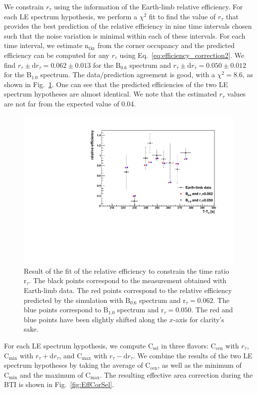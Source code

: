 \documentclass[preprint]{aastex631}
\begin{document}
We constrain $r_\tau$ using the information of the Earth-limb relative efficiency. For each LE spectrum hypothesis, we perform a $\chi^2$ fit to find the value of $r_\tau$ that provides the best prediction of the relative efficiency in nine time intervals chosen such that the noise variation is minimal within each of these intervals. For each time interval, we estimate $\mathrm{n}_\mathrm{tkr}$ from the corner occupancy and the predicted efficiency can be computed for any $r_\tau$ using Eq.~\ref{eq:efficiency_correction2}. We find $r_\tau \pm \mathrm{d}r_\tau = 0.062 \pm 0.013$ for the $\mathrm{B}_{0.6}$ spectrum and $r_\tau \pm \mathrm{d}r_\tau = 0.050 \pm 0.012$ for the $\mathrm{B}_{1.0}$ spectrum. The data/prediction agreement is good, with a $\chi^2 = 8.6$, as shown in Fig.~\ref{fig:Fit_rtau}. One can see that the predicted efficiencies of the two LE spectrum hypotheses are almost identical. We note that the estimated $r_\tau$ values are not far from the expected value of 0.04.

\begin{figure}[t]
    \centering
    \includegraphics[width=0.6\linewidth]{paper_showfitrtau.pdf}
    \caption{Result of the fit of the relative efficiency to constrain the time ratio $\mathrm{r}_\tau$. The black points correspond to the measurement obtained with Earth-limb data. The red points correspond to the relative efficiency predicted by the simulation with $\mathrm{B}_{0.6}$ spectrum and $\mathrm{r}_\tau=0.062$. The blue points correspond to $\mathrm{B}_{1.0}$ spectrum and $\mathrm{r}_\tau=0.050$. The red and blue points have been slightly shifted along the $x$-axis for clarity's sake.}
    \label{fig:Fit_rtau}
\end{figure}

For each LE spectrum hypothesis, we compute $\mathrm{C}_\mathrm{sel}$ in three flavors: $\mathrm{C}_\mathrm{cen}$ with $r_\tau$, $\mathrm{C}_\mathrm{min}$ with $r_\tau + \mathrm{d}r_\tau$, and $\mathrm{C}_\mathrm{max}$ with $r_\tau - \mathrm{d}r_\tau$. We combine the results of the two LE spectrum hypotheses by taking the average of $\mathrm{C}_\mathrm{cen}$, as well as the minimum of $\mathrm{C}_\mathrm{min}$ and the maximum of $\mathrm{C}_\mathrm{max}$. The resulting effective area correction during the BTI is shown in Fig.~\ref{fig:EffCorSel}. 
\end{document}
